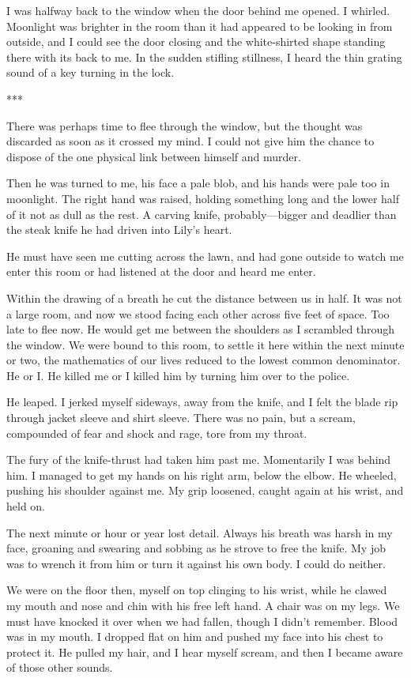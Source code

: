 {I was halfway back to the window when the door behind me opened. I whirled. Moonlight was brighter in the room than it had appeared to be looking in from outside, and I could see the door closing and the white-shirted shape standing there with its back to me. In the sudden stifling stillness, I heard the thin grating sound of a key turning in the lock.

***

There was perhaps time to flee through the window, but the thought was discarded as soon as it crossed my mind. I could not give him the chance to dispose of the one physical link between himself and murder.

Then he was turned to me, his face a pale blob, and his hands were pale too in moonlight. The right hand was raised, holding something long and the lower half of it not as dull as the rest. A carving knife, probably—bigger and deadlier than the steak knife he had driven into Lily’s heart.

He must have seen me cutting across the lawn, and had gone outside to watch me enter this room or had listened at the door and heard me enter.

Within the drawing of a breath he cut the distance between us in half. It was not a large room, and now we stood facing each other across five feet of space. Too late to flee now. He would get me between the shoulders as I scrambled through the window. We were bound to this room, to settle it here within the next minute or two, the mathematics of our lives reduced to the lowest common denominator. He or I. He killed me or I killed him by turning him over to the police.

He leaped. I jerked myself sideways, away from the knife, and I felt the blade rip through jacket sleeve and shirt sleeve. There was no pain, but a scream, compounded of fear and shock and rage, tore from my throat.

The fury of the knife-thrust had taken him past me. Momentarily I was behind him. I managed to get my hands on his right arm, below the elbow. He wheeled, pushing his shoulder against me. My grip loosened, caught again at his wrist, and held on.

The next minute or hour or year lost detail. Always his breath was harsh in my face, groaning and swearing and sobbing as he strove to free the knife. My job was to wrench it from him or turn it against his own body. I could do neither.

We were on the floor then, myself on top clinging to his wrist, while he clawed my mouth and nose and chin with his free left hand. A chair was on my legs. We must have knocked it over when we had fallen, though I didn’t remember. Blood was in my mouth. I dropped flat on him and pushed my face into his chest to protect it. He pulled my hair, and I hear myself scream, and then I became aware of those other sounds.

}
